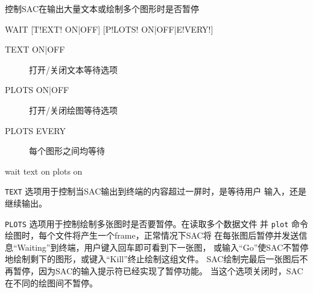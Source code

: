 \label{cmd:wait}

控制SAC在输出大量文本或绘制多个图形时是否暂停

\begin{SACSTX}
WAIT [T!EXT! ON|OFF] [P!LOTS! ON|OFF|E!VERY!]
\end{SACSTX}

\begin{description}
\item [TEXT ON|OFF] 打开/关闭文本等待选项
\item [PLOTS ON|OFF] 打开/关闭绘图等待选项
\item [PLOTS EVERY] 每个图形之间均等待
\end{description}

\begin{SACDFT}
wait text on plots on
\end{SACDFT}

\texttt{TEXT} 选项用于控制当SAC输出到终端的内容超过一屏时，是等待用户
输入，还是继续输出。

\texttt{PLOTS} 选项用于控制绘制多张图时是否要暂停。在读取多个数据文件
并 \texttt{plot} 命令绘图时，每个文件将产生一个frame，正常情况下SAC将
在每张图后暂停并发送信息``Waiting''到终端，用户键入回车即可看到下一张图，
或输入``Go''使SAC不暂停地绘制剩下的图形，或键入``Kill''终止绘制这组文件。
SAC绘制完最后一张图后不再暂停，因为SAC的输入提示符已经实现了暂停功能。
当这个选项关闭时，SAC在不同的绘图间不暂停。
